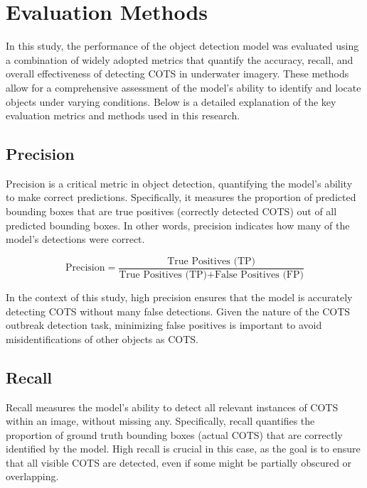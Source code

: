\documentclass[conference]{IEEEtran}
\begin{document}
\section{Evaluation Methods}

In this study, the performance of the object detection model was evaluated using a combination of widely adopted metrics that quantify the accuracy, recall, and overall effectiveness of detecting COTS in underwater imagery. These methods allow for a comprehensive assessment of the model's ability to identify and locate objects under varying conditions. Below is a detailed explanation of the key evaluation metrics and methods used in this research.

\subsection{Precision}
Precision is a critical metric in object detection, quantifying the model’s ability to make correct predictions. Specifically, it measures the proportion of predicted bounding boxes that are true positives (correctly detected COTS) out of all predicted bounding boxes. In other words, precision indicates how many of the model's detections were correct.

\begin{equation}
\text{Precision} = \frac{\text{True Positives (TP)}}{\text{True Positives (TP)} + \text{False Positives (FP)}}
\end{equation}

In the context of this study, high precision ensures that the model is accurately detecting COTS without many false detections. Given the nature of the COTS outbreak detection task, minimizing false positives is important to avoid misidentifications of other objects as COTS.

\subsection{Recall}
Recall measures the model’s ability to detect all relevant instances of COTS within an image, without missing any. Specifically, recall quantifies the proportion of ground truth bounding boxes (actual COTS) that are correctly identified by the model. High recall is crucial in this case, as the goal is to ensure that all visible COTS are detected, even if some might be partially obscured or overlapping.
\end{document}
